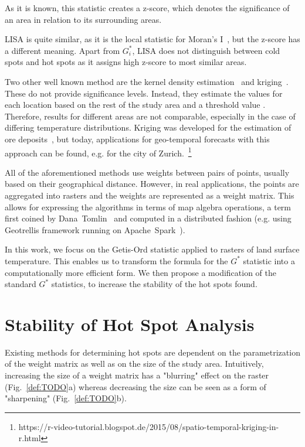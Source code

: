 \documentclass{itatnew}
\begin{document}
As it is known, this statistic creates a z-score, which denotes the significance
of an area in relation to its surrounding areas.

LISA is quite similar, as it is the local statistic for Moran's
I~\cite{Anselin.1995}, but the z-score has a different meaning. Apart from
$G^*_i$, LISA does not distinguish between cold spots and hot spots as it
assigns high z-score to most similar areas.

Two other well known method are the kernel density estimation~\cite{KDE_Hotspot}
and kriging~\cite{Kriging_Hotspot}. These do not provide significance levels.
Instead, they estimate the values for each location based on the rest of the
study area and a threshold value \cite{Thakali2015}. Therefore, results for
different areas are not comparable, especially in the case of differing
temperature distributions. Kriging was developed for the estimation of ore
deposits~\cite{krige1951statistical}, but today, applications for geo-temporal
forecasts with this approach can be found, e.g. for the city of
Zurich.~\footnote{https://r-video-tutorial.blogspot.de/2015/08/spatio-temporal-kriging-in-r.html}

All of the aforementioned methods use weights between pairs of points, usually
based on their geographical distance. However, in real applications, the points
are aggregated into rasters and the weights are represented as a weight matrix.
This allows for expressing the algorithms in terms of map algebra operations, a
term first coined by Dana~Tomlin~\cite{Tomlin1990} and computed in a distributed
fashion (e.g. using Geotrellis framework running on
Apache~Spark~\cite{github:Geotrellis}).

In this work, we focus on the Getis-Ord statistic applied to rasters of land
surface temperature. This enables us to transform the formula for the $G^*$
statistic into a computationally more efficient form. We then propose a
modification of the standard $G^*$ statistics, to increase the stability of the
hot spots found.

\section{Stability of Hot Spot Analysis}
\label{sec:Metric}

Existing methods for determining hot spots are dependent on the parametrization
of the weight matrix as well as on the size of the study area. Intuitively,
increasing the size of a weight matrix has a "blurring" effect on the raster
(Fig.~\ref{def:TODO}a) whereas decreasing the size can be seen as a form of
"sharpening" (Fig.~\ref{def:TODO}b).
\end{document}
